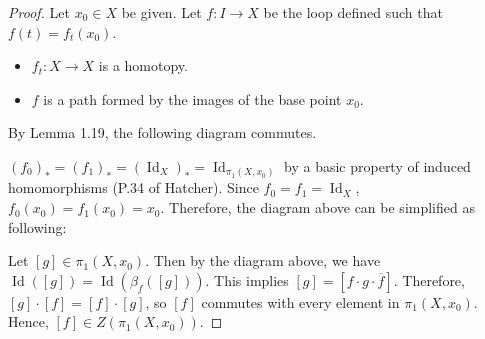 \documentclass[12pt, psamsfonts]{amsart}
\theoremstyle{definition}
\theoremstyle{remark}
\DeclareMathOperator{\Id}{Id}
\numberwithin{equation}{section}
\begin{document}
\begin{proof}
  Let $x_0 \in X$ be given.
  Let $f: I \rightarrow X$ be the loop defined such that $f(t) = f_t(x_0)$.
  \begin{itemize}
    \item
      $f_t: X \rightarrow X$ is a homotopy.
    \item
      $f$ is a path formed by the images of the base point $x_0$.
  \end{itemize}
  By Lemma 1.19, the following diagram commutes.

  \begin{center}
  \end{center}

  $(f_0)_* = (f_1)_* = (\Id_X)_* = \Id_{\pi_1(X, x_0)}$ by a basic property of induced homomorphisms (P.34 of Hatcher).
  Since $f_0 = f_1 = \Id_X$, $f_0(x_0) = f_1(x_0) = x_0$.
  Therefore, the diagram above can be simplified as following:

  \begin{center}
  \end{center}

  Let $[g] \in \pi_1(X, x_0)$.
  Then by the diagram above, we have $\Id([g]) = \Id(\beta_f([g]))$.
  This implies $[g] = [f \cdot g \cdot \overline{f}]$.
  Therefore, $[g] \cdot [f] = [f] \cdot [g]$, so $[f]$ commutes with every element in $\pi_1(X, x_0)$.
  Hence, $[f] \in Z(\pi_1(X, x_0))$.

\end{proof}
\end{document}
